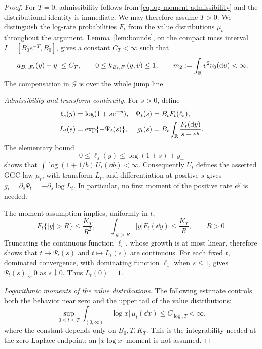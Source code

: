 \begin{proof}
For $T=0$, admissibility follows from \eqref{eq:log-moment-admissibility} and the distributional identity is immediate.
We may therefore assume $T>0$.
We distinguish the log-rate probabilities $F_t$ from the value distributions $\mu_t$ throughout the argument.
Lemma~\ref{lem:bounds}, on the compact mass interval $I=[B_0e^{-T},B_0]$, gives a constant $C_T<\infty$ such that
\begin{equation}
 |a_{B_t,F_t}(y)-y|\le C_T,\qquad 0\le k_{B_t,F_t}(y,v)\le1,
 \qquad m_2:=\int_\mathbb R v^2\nu_0(\mathop{}\!\mathrm d v)<\infty.
 \label{eq:id-generator-bounds}
\end{equation}
The compensation in $\mathcal G$ is over the whole jump line.

\medskip\noindent\emph{Admissibility and transform continuity.}
For $s>0$, define
\begin{equation}
 \begin{aligned}
 \ell_s(y)&=\log(1+se^{-y}),&
 \Psi_t(s)&=B_tF_t(\ell_s),\\
 L_t(s)&=\exp\{-\Psi_t(s)\},&
 g_t(s)&=B_t\int_\mathbb R\frac{F_t(\mathop{}\!\mathrm d y)}{s+e^y}.
 \end{aligned}
 \label{eq:id-transforms}
\end{equation}
The elementary bound
\begin{equation}
 0\le\ell_s(y)\le\log(1+s)+y_-
 \label{eq:id-log-test-bound}
\end{equation}
shows that $\int\log(1+1/b)\,U_t(\dd b)<\infty$.
Consequently $U_t$ defines the asserted GGC law $\mu_t$, with transform $L_t$, and differentiation at positive $s$ gives $g_t=\partial_s\Psi_t=-\partial_s\log L_t$.
In particular, no first moment of the positive rate $e^y$ is needed.

The moment assumption implies, uniformly in $t$,
\begin{equation}
 F_t\{|y|>R\}\le\frac{K_T}{R^2},\qquad
 \int_{|y|>R}|y|F_t(\dd y)\le\frac{K_T}{R},\qquad R>0.
 \label{eq:id-rate-tails}
\end{equation}
Truncating the continuous function $\ell_s$, whose growth is at most linear, therefore shows that $t\mapsto\Psi_t(s)$ and $t\mapsto L_t(s)$ are continuous.
For each fixed $t$, dominated convergence, with dominating function $\ell_1$ when $s\le1$, gives $\Psi_t(s)\downarrow0$ as $s\downarrow0$.
Thus $L_t(0)=1$.

\medskip\noindent\emph{Logarithmic moments of the value distributions.}
The following estimate controls both the behavior near zero and the upper tail of the value distributions:
\begin{equation}
 \sup_{0\le t\le T}\int_{(0,\infty)}|\log x|\,\mu_t(\dd x)
 \le C_{\log,T}<\infty,
 \label{eq:id-log-moment}
\end{equation}
where the constant depends only on $B_0,T,K_T$.
This is the integrability needed at the zero Laplace endpoint; an $|x\log x|$ moment is not assumed.


\end{proof}
